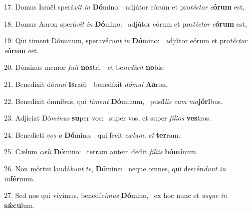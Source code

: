 17. Domus Israël sperá\textit{vit} \textit{in} \textbf{Dó}mino: \ast\  adjútor eórum et pro\textit{téc}\textit{tor} \textit{e}\textbf{ó}\textbf{rum} est,\

18. Domus Aaron sperá\textit{vit} \textit{in} \textbf{Dó}mino: \ast\  adjútor eórum et pro\textit{téc}\textit{tor} \textit{e}\textbf{ó}\textbf{rum} est,\

19. Qui timent Dóminum, speravé\textit{runt} \textit{in} \textbf{Dó}mino: \ast\  adjútor eórum et pro\textit{téc}\textit{tor} \textit{e}\textbf{ó}\textbf{rum} est.\

20. Dóminus memor \textit{fu}\textit{it} \textbf{nos}tri: \ast\  et be\textit{ne}\textit{dí}\textit{xit} \textbf{no}bis:\

21. Benedíxit dó\textit{mu}\textit{i} \textbf{Is}raël: \ast\  benedíxit \textit{dó}\textit{mu}\textit{i} \textbf{A}\textbf{a}ron.\

22. Benedíxit ómnibus, qui \textit{ti}\textit{ment} \textbf{Dó}minum, \ast\  pusíl\textit{lis} \textit{cum} \textit{ma}\textbf{jó}\textbf{ri}bus.\

23. Adjíciat Dó\textit{mi}\textit{nus} \textbf{su}per vos: \ast\  super vos, et super \textit{fí}\textit{li}\textit{os} \textbf{ves}tros.\

24. Benedícti \textit{vos} \textit{a} \textbf{Dó}mino, \ast\  qui fecit \textit{cæ}\textit{lum}, \textit{et} \textbf{ter}ram.\

25. Cælum \textit{cæ}\textit{li} \textbf{Dó}mino: \ast\  terram autem dedit \textit{fí}\textit{li}\textit{is} \textbf{hó}\textbf{mi}num.\

26. Non mórtui laudá\textit{bunt} \textit{te}, \textbf{Dó}mine: \ast\  neque omnes, qui descén\textit{dunt} \textit{in} \textit{in}\textbf{fér}num.\

27. Sed nos qui vívimus, benedí\textit{ci}\textit{mus} \textbf{Dó}mino, \ast\  ex hoc nunc et \textit{us}\textit{que} \textit{in} \textbf{sǽ}\textbf{cu}lum.\

